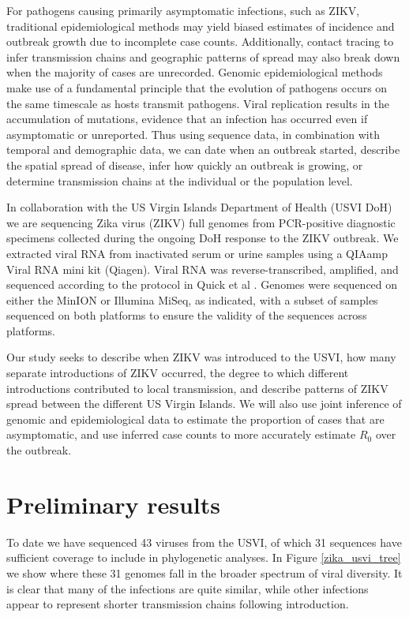 \documentclass[11pt,oneside,letterpaper]{article}
\begin{document}
For pathogens causing primarily asymptomatic infections, such as ZIKV, traditional epidemiological methods may yield biased estimates of incidence and outbreak growth due to incomplete case counts.
Additionally, contact tracing to infer transmission chains and geographic patterns of spread may also break down when the majority of cases are unrecorded.
Genomic epidemiological methods make use of a fundamental principle that the evolution of pathogens occurs on the same timescale as hosts transmit pathogens.
Viral replication results in the accumulation of mutations, evidence that an infection has occurred even if asymptomatic or unreported.
Thus using sequence data, in combination with temporal and demographic data, we can date when an outbreak started, describe the spatial spread of disease, infer how quickly an outbreak is growing, or determine transmission chains at the individual or the population level.

In collaboration with the US Virgin Islands Department of Health (USVI DoH) we are sequencing Zika virus (ZIKV) full genomes from PCR-positive diagnostic specimens collected during the ongoing DoH response to the ZIKV outbreak.
We extracted viral RNA from inactivated serum or urine samples using a QIAamp Viral RNA mini kit (Qiagen).
Viral RNA was reverse-transcribed, amplified, and sequenced according to the protocol in Quick et al \cite{quick2017multiplex}.
Genomes were sequenced on either the MinION or Illumina MiSeq, as indicated, with a subset of samples sequenced on both platforms to ensure the validity of the sequences across platforms.

Our study seeks to describe when ZIKV was introduced to the USVI, how many separate introductions of ZIKV occurred, the degree to which different introductions contributed to local transmission, and describe patterns of ZIKV spread between the different US Virgin Islands.
We will also use joint inference of genomic and epidemiological data to estimate the proportion of cases that are asymptomatic, and use inferred case counts to more accurately estimate $R_0$ over the outbreak.

\section*{Preliminary results}

To date we have sequenced 43 viruses from the USVI, of which 31 sequences have sufficient coverage to include in phylogenetic analyses. In Figure \ref{zika_usvi_tree} we show where these 31 genomes fall in the broader spectrum of viral diversity.
It is clear that many of the infections are quite similar, while other infections appear to represent shorter transmission chains following introduction.
\end{document}
